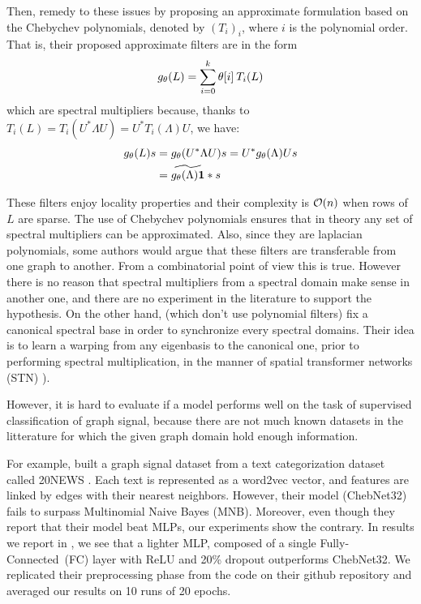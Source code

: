 Then, \cite{defferrard2016convolutional} remedy to these issues by proposing an approximate formulation based on the Chebychev polynomials, denoted by $(T_i)_i$, where $i$ is the polynomial order.
That is, their proposed approximate filters are in the form
\begin{gather}
g_\theta(L) = \sum_{i=0}^k \theta[i] \h{2} T_i(L)
\end{gather}
which are spectral multipliers because, thanks to $T_i(L) = T_i(U^*\Lambda U) = U^*T_i(\Lambda)U$, we have:
\begin{align}
g_\theta(L)s &= g_\theta(U^*\Lambda U)s
= U^* g_\theta(\Lambda) Us\nonumber\\
&= \widetilde{g_\theta(\Lambda) \textbf1} \ast s
\end{align}

These filters enjoy locality properties and their complexity is $\co(n)$ when rows of $L$ are sparse. The use of Chebychev polynomials \citep{hammond2011wavelets} ensures that in theory any set of spectral multipliers can be approximated. Also, since they are laplacian polynomials, some authors would argue that these filters are transferable from one graph to another. From a combinatorial point of view this is true. However there is no reason that spectral multipliers from a spectral domain make sense in another one, and there are no experiment in the literature to support the hypothesis. On the other hand, \citep{yi2016syncspeccnn} (which don't use polynomial filters) fix a canonical spectral base in order to synchronize every spectral domains. Their idea is to learn a warping from any eigenbasis to the canonical one, prior to performing spectral multiplication, in the manner of spatial transformer networks (STN) \cite{jaderberg2015spatial}).

However, it is hard to evaluate if a model performs well on the task of supervised classification of graph signal, because there are not much known datasets in the litterature for which the given graph domain hold enough information.

For example, \citeauthor{defferrard2016convolutional} built a graph signal dataset from a text categorization dataset called 20NEWS \citep{joachims1996probabilistic}. Each text is represented as a word2vec vector, and features are linked by edges with their nearest neighbors. However, their model (ChebNet32) fails to surpass Multinomial Naive Bayes (MNB). Moreover, even though they report that their model beat MLPs, our experiments show the contrary. In results we report in , we see that a lighter MLP, composed of a single Fully-Connected~(FC) layer with ReLU and 20\% dropout outperforms ChebNet32. We replicated their preprocessing phase from the code on their github repository and averaged our results on 10 runs of 20 epochs.

